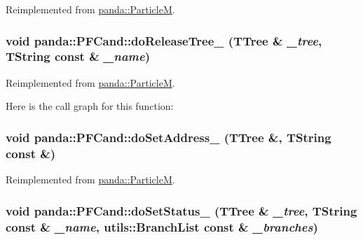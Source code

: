 Reimplemented from \hyperlink{classpanda_1_1ParticleM_ae912914e3970c1fb238589f0ccc783f4}{panda::ParticleM}.\hypertarget{classpanda_1_1PFCand_adefaef174f963c22f95e9ff84b3b4922}{
\subsubsection[{doReleaseTree\_\-}]{\setlength{\rightskip}{0pt plus 5cm}void panda::PFCand::doReleaseTree\_\- (TTree \& {\em \_\-tree}, \/  TString const \& {\em \_\-name})}}
\label{classpanda_1_1PFCand_adefaef174f963c22f95e9ff84b3b4922}


Reimplemented from \hyperlink{classpanda_1_1ParticleM_a0c24df56cbd50a8223fc4d8bf0b776d0}{panda::ParticleM}.

Here is the call graph for this function:\hypertarget{classpanda_1_1PFCand_a2b6d101e2b1391e4c942b1f5ec2f6151}{
\subsubsection[{doSetAddress\_\-}]{\setlength{\rightskip}{0pt plus 5cm}void panda::PFCand::doSetAddress\_\- (TTree \&, \/  TString const \&)}}
\label{classpanda_1_1PFCand_a2b6d101e2b1391e4c942b1f5ec2f6151}


Reimplemented from \hyperlink{classpanda_1_1ParticleM_ab54d46a237f8d12074ee36c48af33b04}{panda::ParticleM}.\hypertarget{classpanda_1_1PFCand_a263dcf1e5a9b704827d4b4af006ebcf4}{
\subsubsection[{doSetStatus\_\-}]{\setlength{\rightskip}{0pt plus 5cm}void panda::PFCand::doSetStatus\_\- (TTree \& {\em \_\-tree}, \/  TString const \& {\em \_\-name}, \/  {\bf utils::BranchList} const \& {\em \_\-branches})}}
\label{classpanda_1_1PFCand_a263dcf1e5a9b704827d4b4af006ebcf4}


